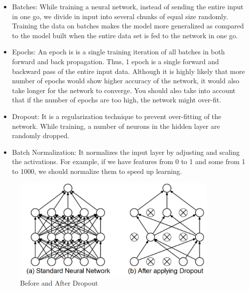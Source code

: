 \begin{itemize}
    \item Batches: While training a neural network, instead of sending the entire input in one go, we divide in input into several chunks of equal size randomly. Training the data on batches makes the model more generalized as compared to the model built when the entire data set is fed to the network in one go.
    \item Epochs: An epoch is is a single training iteration of all batches in both forward and back propagation. Thus, 1 epoch is a single forward and backward pass of the entire input data. Although it is highly likely that more number of epochs would show higher accuracy of the network, it would also take longer for the network to converge. You should also take into account that if the number of epochs are too high, the network might over-fit.
    \item Dropout: It is a regularization technique to prevent over-fitting of the network. While training, a number of neurons in the hidden layer are randomly dropped.
    \item Batch Normalization: It normalizes the input layer by adjusting and scaling the activations. For example, if we have features from 0 to 1 and some from 1 to 1000, we should normalize them to speed up learning.
\end{itemize}
\begin{figure}[h!]
    \centering
    \includegraphics[width=0.9\textwidth]{img/dropout.png}
    \caption{Before and After Dropout}
    \label{fig:droupout}
\end{figure}

